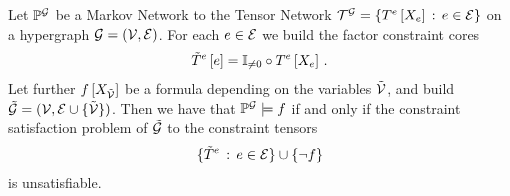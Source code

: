 \begin{theorem}
    \label{the:factorReduction}
    Let $\mathbb{P}^{\mathcal{G}}$ be a Markov Network to the Tensor Network $\mathcal{T}^{\mathcal{G}}=\left\{T^{e}\left[X_{e}\right]\, : \, e\in\mathcal{E}\right\}$ on a hypergraph $\mathcal{G}=(\mathcal{V},\mathcal{E})$. %
    For each $e\in\mathcal{E}$ we build the factor constraint cores
    \begin{align*}
        \tilde{T}^{e}\left[e\right] = \mathbb{I}_{\neq0}\circ T^{e}\left[X_{e}\right] \, .
    \end{align*}
    Let further $f\left[X_{\tilde{\mathcal{V}}}\right]$ be a formula depending on the variables $\tilde{\mathcal{V}}$, and build $\tilde{\mathcal{G}}=(\mathcal{V},\mathcal{E}\cup\{\tilde{\mathcal{V}}\})$.
    Then we have that $\mathbb{P}^{\mathcal{G}}\models f$ if and only if the constraint satisfaction problem of $\tilde{\mathcal{G}}$ to the constraint tensors
    \begin{align*}
        \{\tilde{T}^{e} \, : \, e\in\mathcal{E} \} \cup \{\lnot f \}
    \end{align*}
    is unsatisfiable.
\end{theorem}
